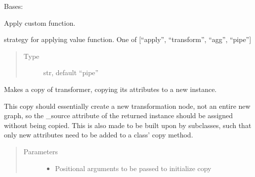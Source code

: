 \documentclass[letterpaper,10pt,english]{sphinxmanual}
\begin{document}
\begin{fulllineitems}
\label{\detokenize{dalio.pipe:dalio.pipe.col_generation.Custom}}
Bases: 

Apply custom function.

\begin{fulllineitems}
\label{\detokenize{dalio.pipe:dalio.pipe.col_generation.Custom.strategy}}
strategy for applying value function.
One of {[}“apply”, “transform”, “agg”, “pipe”{]}
\begin{quote}\begin{description}
\item[{Type}] \leavevmode
str, default “pipe”

\end{description}\end{quote}

\end{fulllineitems}


\begin{fulllineitems}
\label{\detokenize{dalio.pipe:dalio.pipe.col_generation.Custom.copy}}
Makes a copy of transformer, copying its attributes to a new
instance.

This copy should essentially create a new transformation node, not an
entire new graph, so the \_source attribute of the returned instance
should be assigned without being copied. This is also made to be built
upon by subclasses, such that only new attributes need to be added to
a class’ copy method.
\begin{quote}\begin{description}
\item[{Parameters}] \leavevmode\begin{itemize}
\item {} 
 \textendash{} Positional arguments to be passed to initialize copy


\end{itemize}
\end{description}
\end{quote}
\end{fulllineitems}
\end{fulllineitems}
\end{document}

